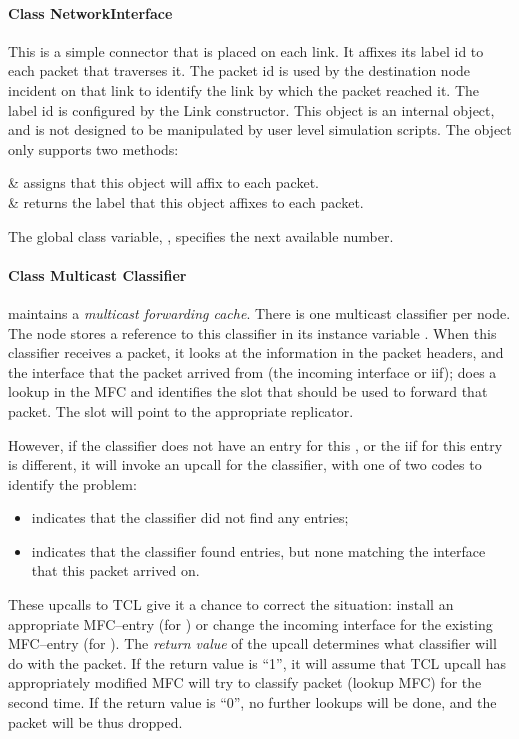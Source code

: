 \paragraph{Class NetworkInterface}
This is a simple connector that is placed on each link.  It affixes
its label id to each packet that traverses it.  The packet id is used
by the destination node incident on that link to identify the link by
which the packet reached it.  The label id is configured by the Link
constructor.  This object is an internal object, and is not designed
to be manipulated by user level simulation scripts.  The object only
supports two methods:
\begin{alist}
 & 
        assigns  that this object will affix to each packet. \\
 & 
        returns the label that this object affixes to each packet.\\
\end{alist}
The global class variable, , specifies the next
available  number.

\paragraph{Class Multicast Classifier}
 maintains a \emph{multicast forwarding
cache}.  There is one multicast classifier per node. The node stores a
reference to this classifier in its instance variable
. When this classifier receives a packet, it
looks at the  information in the packet headers,
and the interface that the packet arrived from (the incoming interface
or iif); does a lookup in the MFC and identifies the slot that should
be used to forward that packet.  The slot will point to the
appropriate replicator.

However, if the classifier does not have an entry for this
, or the iif for this entry is different, it will
invoke an upcall  for the classifier, with one of
two codes to identify the problem:

\begin{itemize}
        \item {} indicates that the classifier did not
        find any  entries;

        \item {} indicates that the classifier found
         entries, but none matching the interface
        that this packet arrived on.
\end{itemize}
These upcalls to TCL give it a chance to correct the situation:
install an appropriate MFC--entry (for ) or change
the incoming interface for the existing MFC--entry (for
).  The \emph{return value} of the upcall determines
what classifier will do with the packet.  If the return value is
``1'', it will assume that TCL upcall has appropriately modified MFC
will try to classify packet (lookup MFC) for the second time.  If the
return value is ``0'', no further lookups will be done, and the packet
will be thus dropped.

